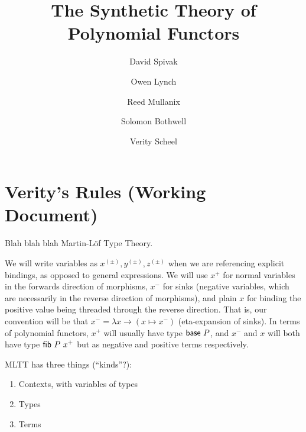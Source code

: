 \documentclass[final]{amsart}
\title{The Synthetic Theory of Polynomial Functors}
\author{David Spivak}
\author{Owen Lynch}
\author{Reed Mullanix}
\author{Solomon Bothwell}
\author{Verity Scheel}
\begin{document}
\maketitle

\section{Verity's Rules (Working Document)}

Blah blah blah Martin-L\"of Type Theory.

We will write variables as $x^{(\pm)}, y^{(\pm)}, z^{(\pm)}$ when we are referencing explicit bindings, as opposed to general expressions.
We will use $x^{+}$ for normal variables in the forwards direction of morphisms, $x^{-}$ for sinks (negative variables, which are necessarily in the reverse direction of morphisms), and plain $x$ for binding the positive value being threaded through the reverse direction.
That is, our convention will be that $x^{-} = \lambda x \to (x \mapsto x^{-})$ (eta-expansion of sinks).
In terms of polynomial functors, $x^{+}$ will usually have type $\mathsf{base}\ P$, and $x^{-}$ and $x$ will both have type $\mathsf{fib}\ P\ x^{+}$ but as negative and positive terms respectively.

MLTT has three things (``kinds''?):
\begin{enumerate}
  \item Contexts, with variables of types
  \item Types
  \item Terms
\end{enumerate}
\end{document}
